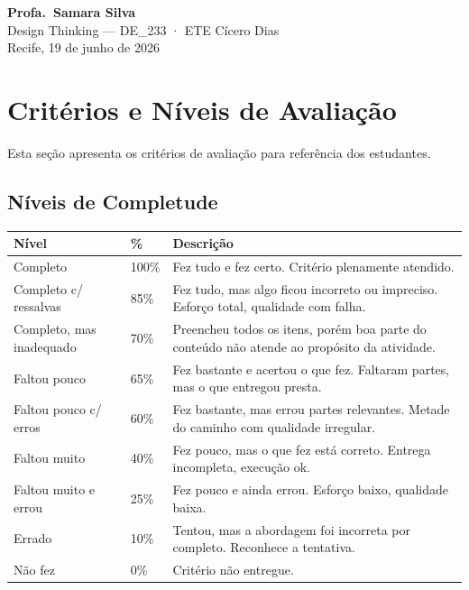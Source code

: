 \documentclass[
  sigconf,
  nonacm, %
  language=portuguese
]{acmart}
\begin{document}
\begin{flushright}
\textbf{Profa.\ Samara Silva}\\
{\small\color{cmuted} Design Thinking --- DE\_233 · ETE Cícero Dias}\\
{\small\color{cmuted} Recife, 19 de junho de 2026}
\end{flushright}


\appendix
\onecolumn
\section{Critérios e Níveis de Avaliação}

Esta seção apresenta os critérios de avaliação para referência dos estudantes.

\subsection{Níveis de Completude}

\begin{tabularx}{\linewidth}{@{} p{4cm} p{1.5cm} X @{}}
\toprule
\textbf{Nível} & \textbf{\%} & \textbf{Descrição} \\
\midrule
Completo & 100\% & Fez tudo e fez certo. Critério plenamente atendido. \\
Completo c/ ressalvas & 85\% & Fez tudo, mas algo ficou incorreto ou impreciso. Esforço total, qualidade com falha. \\
Completo, mas inadequado & 70\% & Preencheu todos os itens, porém boa parte do conteúdo não atende ao propósito da atividade. \\
Faltou pouco & 65\% & Fez bastante e acertou o que fez. Faltaram partes, mas o que entregou presta. \\
Faltou pouco c/ erros & 60\% & Fez bastante, mas errou partes relevantes. Metade do caminho com qualidade irregular. \\
Faltou muito & 40\% & Fez pouco, mas o que fez está correto. Entrega incompleta, execução ok. \\
Faltou muito e errou & 25\% & Fez pouco e ainda errou. Esforço baixo, qualidade baixa. \\
Errado & 10\% & Tentou, mas a abordagem foi incorreta por completo. Reconhece a tentativa. \\
Não fez & 0\% & Critério não entregue. \\
\bottomrule
\end{tabularx}
\end{document}

